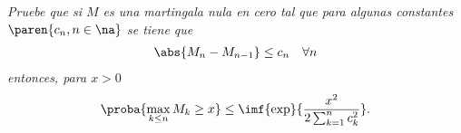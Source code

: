 \emph{
	Pruebe que si $M$ es una martingala nula en cero tal que para algunas constantes $\paren{c_n,n\in\na}$ se tiene que
	\begin{align}
		\abs{M_n-M_{n-1}}\leq c_n\quad\forall n
	\end{align}
	entonces, para $x>0$
	\begin{align}
		\proba{\max_{k\leq n} M_k\geq x}\leq \imf{\exp}{\frac{x^2}{2\sum_{k=1}^n c_k^2}}.
	\end{align}
}